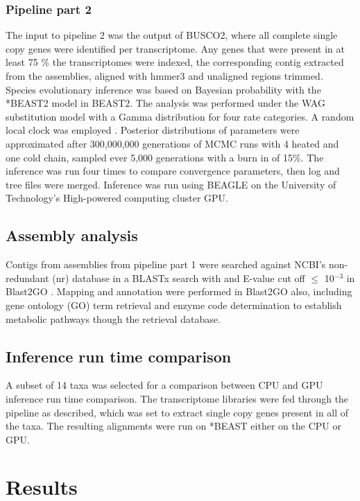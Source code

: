 \documentclass[12pt]{article}
\begin{document}
\subsubsection*{Pipeline part 2}
The input to pipeline 2 was the output of BUSCO2, where all complete single copy genes were identified per transcriptome. 
Any genes that were present in at least 75 \% the transcriptomes were indexed, the corresponding contig extracted from the assemblies, aligned with hmmer3 and unaligned regions trimmed. 
Species evolutionary inference was based on Bayesian probability with the *BEAST2 model in BEAST2. 
The analysis was performed under the WAG substitution model \cite{whelan2001general} with a Gamma distribution for four rate categories. 
A random local clock was employed \cite{drummond2010bayesian}. 
Posterior distributions of parameters were approximated after 300,000,000 generations of MCMC runs with 4 heated and one cold chain, sampled ever 5,000 generations  with a burn in of 15\%. 
The inference was run four times to compare convergence parameters, then log and tree files were merged. 
Inference was run using BEAGLE \cite{ayres2011beagle} on the University of Technology's High-powered computing cluster GPU.

\subsection*{Assembly analysis}
Contigs from assemblies from pipeline part 1 were searched against NCBI's non-redundant (nr) database in a BLASTx search with and E-value cut off $\leq$ 10$^{-3}$ in Blast2GO \cite{conesa2005blast2go}. 
Mapping and annotation were performed in Blast2GO also, including gene ontology (GO) term retrieval and enzyme code determination to establish metabolic pathways though the retrieval database.
\subsection*{Inference run time comparison}
A subset of 14 taxa was selected for a comparison between CPU and GPU inference run time comparison. 
The transcriptome libraries were fed through the pipeline as described, which was set to extract single copy genes present in all of the taxa. 
The resulting alignments were run on *BEAST either on the CPU or GPU.

\newpage
\section{Results}
\end{document}
